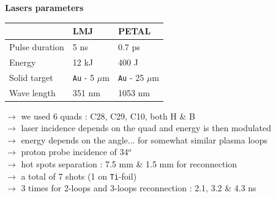 \documentclass[landscape]{slides}
\begin{document}
\begin{slide}
{\large \textbf{Lasers parameters}}

\bigskip

\begin{center}
\begin{tabular}{lll}
\hline
\hline
\hspace{8.0cm} & LMJ\hspace{4.0cm}  & PETAL\hspace{2.0cm}  \\
\hline
Pulse duration             & 5 ns                    & 0.7 ps \\
Energy                     & 12 kJ                   & 400 J \\
Solid target               & \texttt{Au} - 5 $\mu$m  & \texttt{Au} - 25 $\mu$m \\
Wave length                & 351 nm                  & 1053 nm \\
\hline
\hline
\end{tabular}
\end{center}

\bigskip

$\to$ we used 6 quads : C28, C29, C10, both H \& B \\
$\to$ laser incidence depends on the quad and energy is then modulated  \\
$\to$ energy depends on the angle... for somewhat similar plasma loops \\
$\to$ proton probe incidence of 34$^o$ \\
$\to$ hot spots separation : 7.5 mm \& 1.5 mm for reconnection \\
$\to$ a total of 7 shots (1 on \texttt{Ti}-foil) \\
$\to$ 3 times for 2-loops and 3-loops reconnection : 2.1, 3.2 \& 4.3 ns \\

\end{slide}
\end{document}
